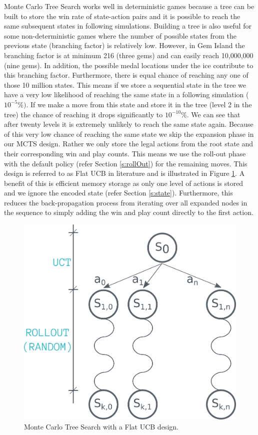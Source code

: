 \documentclass{bhamthesis}
\theoremstyle{definition}
\begin{document}
Monte Carlo Tree Search works well in deterministic games because a tree can be built to store the win rate of state-action pairs and it is possible to reach the same subsequent states in following simulations. Building a tree is also useful for some non-deterministic games where the number of possible states from the previous state (branching factor) is relatively low. However, in Gem Island the branching factor is at minimum 216 (three gems) and can easily reach 10,000,000 (nine gems). In addition, the possible medal locations under the ice contribute to this branching factor. Furthermore, there is equal chance of reaching any one of those 10 million states. This means if we store a sequential state in the tree we have a very low likelihood of reaching the same state in a following simulation ($10^{-5}\%)$. If we make a move from this state and store it in the tree (level 2 in the tree) the chance of reaching it drops significantly to $10^{-10}\%$. We can see that after twenty levels it is extremely unlikely to reach the same state again. Because of this very low chance of reaching the same state we skip the expansion phase in our MCTS design. Rather we only store the legal actions from the root state and their corresponding win and play counts. This means we use the roll-out phase with the default policy (refer Section \ref{s:rollOut}) for the remaining moves. This design is referred to as Flat UCB in literature \cite{Coquelin2007} and is illustrated in Figure \ref{f:mctsImplementation}. A benefit of this is efficient memory storage as only one level of actions is stored and we ignore the encoded state (refer Section \ref{s:state}). Furthermore, this reduces the back-propagation process from iterating over all expanded nodes in the sequence to simply adding the win and play count directly to the first action.

\begin{figure}
	\centering
	\includegraphics[width=.6\textwidth]{media/img/mctsImplementation}
	\caption{Monte Carlo Tree Search with a Flat UCB design.}\label{f:mctsImplementation}
\end{figure}
\end{document}
